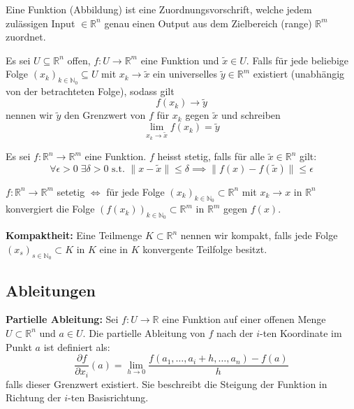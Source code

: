 \begin{definition}
    Eine Funktion (Abbildung) ist eine Zuordnungsvorschrift, welche jedem zulässigen Input $\in \mathbb{R}^n$ genau einen Output aus dem Zielbereich (range) $\mathbb{R}^m$ zuordnet.
\end{definition}

\begin{definition}
    Es sei $U \subseteq \mathbb{R}^n$ offen, $f : U \to \mathbb{R}^m$ eine Funktion und $\tilde{x} \in U$. Falls für jede beliebige Folge $(x_k)_{k\in\mathbb{N}_0} \subseteq U$ mit $x_k \to \tilde{x}$ ein universelles $\tilde{y} \in \mathbb{R}^m$ existiert (unabhängig von der betrachteten Folge), sodass gilt
    $$f(x_k) \to \tilde{y}$$
    nennen wir $\tilde{y}$ den Grenzwert von $f$ für $x_k$ gegen $\tilde{x}$ und schreiben
    $$\lim_{x_k \to \tilde{x}} f(x_k) = \tilde{y}$$ 
\end{definition}

\begin{definition}
    Es sei $f : \mathbb{R}^n \to \mathbb{R}^m$ eine Funktion. $f$ heisst stetig, falls für alle $\tilde{x} \in \mathbb{R}^n$ gilt:
    $$\forall \epsilon > 0 \;\exists \delta > 0 \text{ s.t. } \|x - \tilde{x}\| \le \delta \implies \|f(x) - f(\tilde{x})\| \le \epsilon$$
\end{definition}

\begin{lemma}
    $f : \mathbb{R}^n \to \mathbb{R}^m$ setetig $\iff$ für jede Folge $(x_k)_{k\in\mathbb{N}_0} \subset \mathbb{R}^n$ mit $x_k \to x$ in $\mathbb{R}^n$ konvergiert die Folge $(f(x_k))_{k\in\mathbb{N}_0} \subset \mathbb{R}^m$ in $\mathbb{R}^m$ gegen $f(x)$.
\end{lemma}

\begin{definition}
    \textbf{Kompaktheit:} Eine Teilmenge $K \subset \mathbb{R}^n$ nennen wir kompakt, falls jede Folge $(x_s)_{s\in\mathbb{N}_0} \subset K$ in $K$ eine in $K$ konvergente Teilfolge besitzt.
\end{definition}

\subsection{Ableitungen}

\begin{definition}
    \textbf{Partielle Ableitung:} Sei $f: U \to \mathbb{R}$ eine Funktion auf einer offenen Menge $U \subset \mathbb{R}^n$ und $a \in U$. Die partielle Ableitung von $f$ nach der $i$-ten Koordinate im Punkt $a$ ist definiert als:
    $$ \frac{\partial f}{\partial x_i}(a) = \lim_{h \to 0} \frac{f(a_1, \dots, a_i + h, \dots, a_n) - f(a)}{h} $$
    falls dieser Grenzwert existiert. Sie beschreibt die Steigung der Funktion in Richtung der $i$-ten Basisrichtung.
\end{definition}

